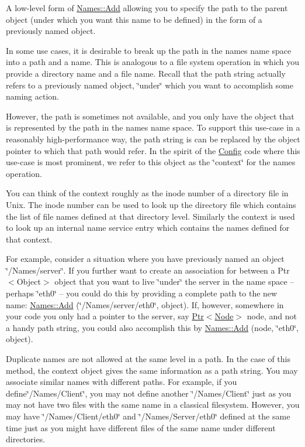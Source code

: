 A low-\/level form of \hyperlink{classns3_1_1Names_a5075ee36f97059d897cf6430ce61e592}{Names\+::\+Add} allowing you to specify the path to the parent object (under which you want this name to be defined) in the form of a previously named object. 

In some use cases, it is desirable to break up the path in the names name space into a path and a name. This is analogous to a file system operation in which you provide a directory name and a file name. Recall that the path string actually refers to a previously named object, \char`\"{}under\char`\"{} which you want to accomplish some naming action.

However, the path is sometimes not available, and you only have the object that is represented by the path in the names name space. To support this use-\/case in a reasonably high-\/performance way, the path string is can be replaced by the object pointer to which that path would refer. In the spirit of the \hyperlink{namespacens3_1_1Config}{Config} code where this use-\/case is most prominent, we refer to this object as the \char`\"{}context\char`\"{} for the names operation.

You can think of the context roughly as the inode number of a directory file in Unix. The inode number can be used to look up the directory file which contains the list of file names defined at that directory level. Similarly the context is used to look up an internal name service entry which contains the names defined for that context.

For example, consider a situation where you have previously named an object \char`\"{}/\+Names/server\char`\"{}. If you further want to create an association for between a Ptr$<$\+Object$>$ object that you want to live \char`\"{}under\char`\"{} the server in the name space -- perhaps \char`\"{}eth0\char`\"{} -- you could do this by providing a complete path to the new name\+: \hyperlink{classns3_1_1Names_a5075ee36f97059d897cf6430ce61e592}{Names\+::\+Add} (\char`\"{}/\+Names/server/eth0\char`\"{}, object). If, however, somewhere in your code you only had a pointer to the server, say \hyperlink{classns3_1_1Ptr}{Ptr$<$\+Node$>$} node, and not a handy path string, you could also accomplish this by \hyperlink{classns3_1_1Names_a5075ee36f97059d897cf6430ce61e592}{Names\+::\+Add} (node, \char`\"{}eth0\char`\"{}, object).

Duplicate names are not allowed at the same level in a path. In the case of this method, the context object gives the same information as a path string. You may associate similar names with different paths. For example, if you define\char`\"{}/\+Names/\+Client\char`\"{}, you may not define another \char`\"{}/\+Names/\+Client\char`\"{} just as you may not have two files with the same name in a classical filesystem. However, you may have \char`\"{}/\+Names/\+Client/eth0\char`\"{} and \char`\"{}/\+Names/\+Server/eth0\char`\"{} defined at the same time just as you might have different files of the same name under different directories.


